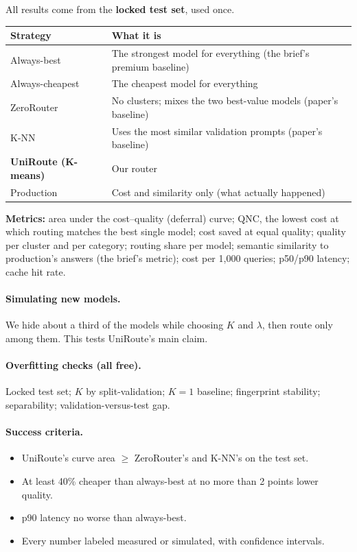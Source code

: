 \documentclass[11pt,a4paper]{article}
\begin{document}
All results come from the \textbf{locked test set}, used once.

\medskip
\noindent\begin{tabularx}{\linewidth}{@{}P{42mm} L@{}}
\toprule
\textbf{Strategy} & \textbf{What it is} \\
\midrule
Always-best & The strongest model for everything (the brief's premium baseline) \\
Always-cheapest & The cheapest model for everything \\
ZeroRouter & No clusters; mixes the two best-value models (paper's baseline) \\
K-NN & Uses the most similar validation prompts (paper's baseline) \\
\textbf{UniRoute (K-means)} & Our router \\
Production & Cost and similarity only (what actually happened) \\
\bottomrule
\end{tabularx}

\medskip
\noindent\textbf{Metrics:} area under the cost--quality (deferral) curve; QNC, the lowest cost at
which routing matches the best single model; cost saved at equal quality; quality per cluster and per
category; routing share per model; semantic similarity to production's answers (the brief's metric);
cost per 1{,}000 queries; p50/p90 latency; cache hit rate.

\paragraph{Simulating new models.} We hide about a third of the models while choosing $K$ and
$\lambda$, then route only among them. This tests UniRoute's main claim.

\paragraph{Overfitting checks (all free).} Locked test set; $K$ by split-validation; $K=1$ baseline;
fingerprint stability; separability; validation-versus-test gap.

\paragraph{Success criteria.}
\begin{itemize}
  \item UniRoute's curve area $\ge$ ZeroRouter's and K-NN's on the test set.
  \item At least 40\% cheaper than always-best at no more than 2 points lower quality.
  \item p90 latency no worse than always-best.
  \item Every number labeled measured or simulated, with confidence intervals.
\end{itemize}
\end{document}
